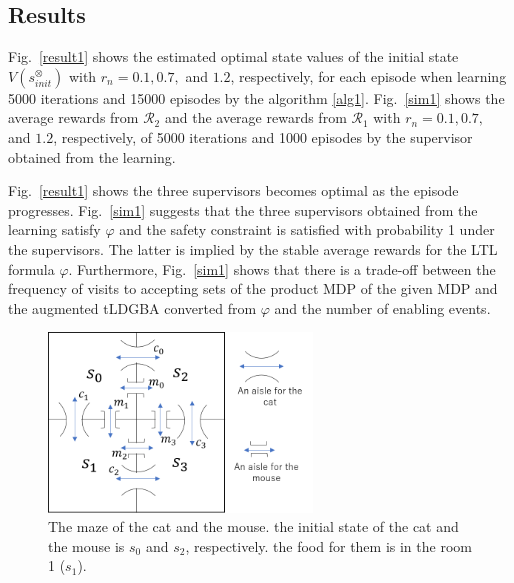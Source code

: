 \subsection*{Results}

Fig.\ \ref{result1} shows the estimated optimal state values of the initial state $V(s^{\otimes}_{init})$ with $r_{n} = 0.1, 0.7,$ and $1.2$, respectively, for each episode when learning 5000 iterations and 15000 episodes by the algorithm \ref{alg1}.
Fig.\ \ref{sim1} shows the average rewards from $\mathcal{R}_2$ and the average rewards from $\mathcal{R}_1$ with $r_{n} = 0.1, 0.7,$ and $1.2$, respectively, of 5000 iterations and 1000 episodes by the supervisor obtained from the learning.

Fig.\ \ref{result1} shows the three supervisors becomes optimal as the episode progresses.
Fig.\ \ref{sim1} suggests that the three supervisors obtained from the learning satisfy $\varphi$ and the safety constraint is satisfied with probability 1 under the supervisors. The latter is implied by the stable average rewards for the LTL formula $\varphi$.
Furthermore, Fig.\ \ref{sim1} shows that there is a trade-off between the frequency of visits to accepting sets of the product MDP of the given MDP and the augmented tLDGBA converted from $\varphi$ and the number of enabling events.

\begin{figure}[htbp]
   \centering
   \vspace{2mm}
   \includegraphics[width=7cm]{cat_mouse.png}
   \caption{The maze of the cat and the mouse. the initial state of the cat and the mouse is $s_0$ and $s_2$, respectively. the food for them is in the room 1 ($s_1$).}
   \label{cat_mouse}
\end{figure}

